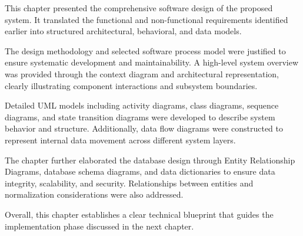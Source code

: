 This chapter presented the comprehensive software design of the proposed system. 
It translated the functional and non-functional requirements identified earlier 
into structured architectural, behavioral, and data models.

The design methodology and selected software process model were justified to 
ensure systematic development and maintainability. A high-level system overview 
was provided through the context diagram and architectural representation, 
clearly illustrating component interactions and subsystem boundaries.

Detailed UML models including activity diagrams, class diagrams, sequence diagrams, 
and state transition diagrams were developed to describe system behavior and structure. 
Additionally, data flow diagrams were constructed to represent internal data movement 
across different system layers.

The chapter further elaborated the database design through Entity Relationship Diagrams, 
database schema diagrams, and data dictionaries to ensure data integrity, scalability, 
and security. Relationships between entities and normalization considerations were 
also addressed.

Overall, this chapter establishes a clear technical blueprint that guides the 
implementation phase discussed in the next chapter.
